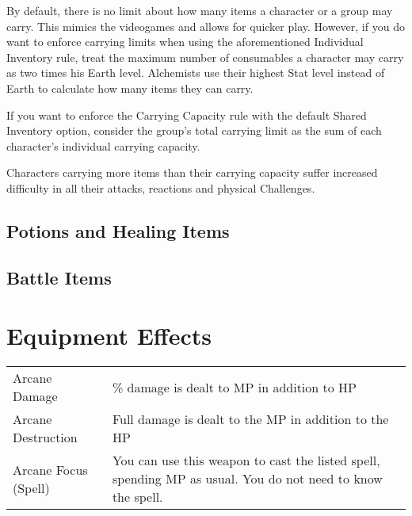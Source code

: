 \begin{multicols}{2}
\begin{boco}
By default, there is no limit about how many items a character or a group may carry. This mimics the videogames and allows for quicker play. However, if you do want to enforce carrying limits when using the aforementioned Individual Inventory rule, treat the maximum number of consumables a character may carry as two times his Earth level. Alchemists use their highest Stat level instead of Earth to calculate how many items they can carry. \pc%

If you want to enforce the Carrying Capacity rule with the default Shared Inventory option, consider the group's total carrying limit as the sum of each character's individual carrying capacity. \pc%

Characters carrying more items than their carrying capacity suffer increased difficulty in all their attacks, reactions and physical Challenges.

\end{boco}

\end{multicols}

\clearpage
\subsection{Potions and Healing Items}\label{subsec:potions}

\begin{tabitem}[label=inv-potions]
    \tabitemrow[name=Tonic,cost=25,effect=Heals 25 HP to a single target]
\end{tabitem}

\clearpage
\subsection{Battle Items}\label{subsec:battleitems}

\begin{tabitem}[label=inv-battles]
    
\end{tabitem}
\vfill
\begin{center}
\end{center}

\clearpage
\section{Equipment Effects}\label{sec:equipeffects}

\begin{table}[h]
    \begin{tabular}{p{}<{\arraybackslash\dotfill}@{}>{\raggedleft\arraybackslash\dotfill}p{}}
        Arcane Damage & 50\% damage is dealt to MP in addition to HP \\
        Arcane Destruction & Full damage is dealt to the MP in addition to the HP \\
        Arcane Focus (Spell) & You can use this weapon to cast the listed spell, spending MP as usual.  You do not need to know the spell. \\
    \end{tabular}
\end{table}
